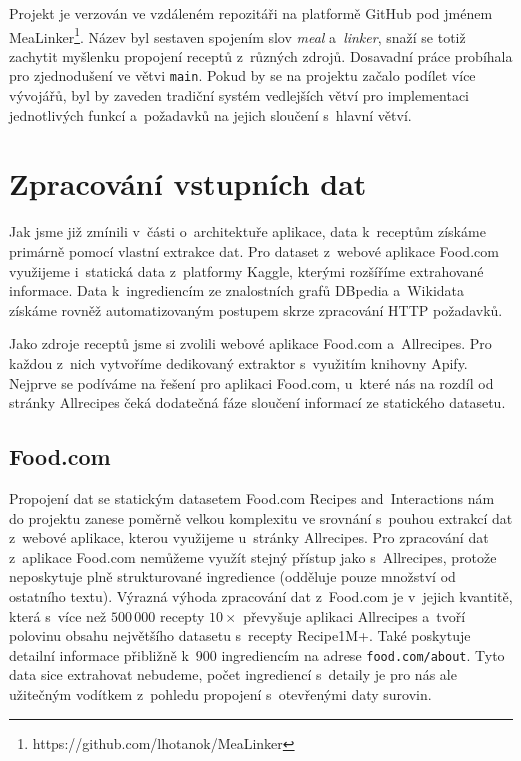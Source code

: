 Projekt je verzován ve vzdáleném repozitáři na platformě GitHub pod jménem MeaLinker\footnote{https://github.com/lhotanok/MeaLinker}. Název byl sestaven spojením slov \emph{meal} a~\emph{linker}, snaží se totiž zachytit myšlenku propojení receptů z~různých zdrojů. Dosavadní práce probíhala pro zjednodušení ve větvi \texttt{main}. Pokud by se na projektu začalo podílet více vývojářů, byl by zaveden tradiční systém vedlejších větví pro implementaci jednotlivých funkcí a~požadavků na jejich sloučení s~hlavní větví.

\section{Zpracování vstupních dat}

Jak jsme již zmínili v~části o~architektuře aplikace, data k~receptům získáme primárně pomocí vlastní extrakce dat. Pro dataset z~webové aplikace Food.com využijeme i~statická data z~platformy Kaggle, kterými rozšíříme extrahované informace. Data k~ingrediencím ze znalostních grafů DBpedia a~Wikidata získáme rovněž automatizovaným postupem skrze zpracování HTTP požadavků.

Jako zdroje receptů jsme si zvolili webové aplikace Food.com a~Allrecipes. Pro každou z~nich vytvoříme dedikovaný extraktor s~využitím knihovny Apify. Nejprve se podíváme na řešení pro aplikaci Food.com, u~které nás na rozdíl od stránky Allrecipes čeká dodatečná fáze sloučení informací ze statického datasetu.

\subsection{Food.com}

Propojení dat se statickým datasetem Food.com Recipes and~Interactions nám do projektu zanese poměrně velkou komplexitu ve srovnání s~pouhou extrakcí dat z~webové aplikace, kterou využijeme u~stránky Allrecipes. Pro zpracování dat z~aplikace Food.com nemůžeme využít stejný přístup jako s~Allrecipes, protože neposkytuje plně strukturované ingredience (odděluje pouze množství od ostatního textu). Výrazná výhoda zpracování dat z~Food.com je v~jejich kvantitě, která s~více než $500\,000$ recepty $10\times$ převyšuje aplikaci Allrecipes a~tvoří polovinu obsahu největšího datasetu s~recepty Recipe1M+. Také poskytuje detailní informace přibližně k~$900$ ingrediencím na adrese \texttt{food.com/about}. Tyto data sice extrahovat nebudeme, počet ingrediencí s~detaily je pro nás ale užitečným vodítkem z~pohledu propojení s~otevřenými daty surovin.

